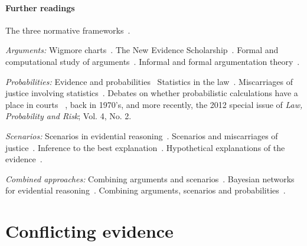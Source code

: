 \documentclass[10pt]{article}
\begin{document}

\paragraph{Further readings} 
The three normative frameworks~\citep{andersonEtal2005,kapteinEtal2009,dawidEtal2011}. 

\textit{Arguments:} Wigmore charts~\citep{wigmore1913,wigmore1931}. The New Evidence Scholarship~\citep{andersonEtal2005}. 
Formal and computational study of arguments~\citep{pollock1987,pollock1995}.
Informal and formal argumentation theory~\citep{vanEemerenEtal2014}.

\textit{Probabilities:}
Evidence and probabilities~\cite{schum1994,morteraDawid2007}
Statistics in the law~\citep{fenton2011}. Miscarriages of justice involving statistics~\citep{dawidEtal2011,schnepsColmez2013}.
Debates on whether probabilistic calculations have a place in courts ~\citet{finkelsteinFairley1970,tribe1971}, back in 
1970's, and more recently, the 2012 special issue of \textit{Law, Probability and Risk}; Vol. 4, No. 2. 

\textit{Scenarios:}
Scenarios in evidential reasoning~\citep{bennettFeldman1981,penningtonHastie1993,penningtonHastie1993StoryModel}. Scenarios and miscarriages of justice~\citep{wagenaarEtal1993}. Inference to the best explanation~\citep{pardoAllen2008}. Hypothetical explanations of the evidence~\citep{thagard1989}. 


\textit{Combined approaches:}
Combining arguments and scenarios~\citep{bexEtal2010,bex2011}. Bayesian networks for evidential reasoning~\citep{heplerEtal2007,fentonNeilLagnado2013}. Combining arguments, scenarios and probabilities~\citep{vlekEtal2014, timmerEtAl2015ecsqaru, verheijEtal2016,verheij2014}.  

\section{Conflicting evidence}
\label{sec:conf}
 	
\end{document}
